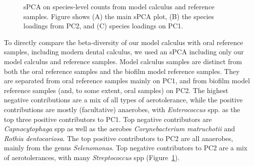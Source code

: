 \documentclass[
  b5paper,
]{book}
\begin{document}
\begin{figure}


\caption{\label{fig-spca-compar}sPCA on species-level counts from model
calculus and reference samples. Figure shows (A) the main sPCA plot, (B)
the species loadings from PC2, and (C) species loadings on PC1.}

\end{figure}%

To directly compare the beta-diversity of our model calculus with oral
reference samples, including modern dental calculus, we used an sPCA
including only our model calculus and reference samples. Model calculus
samples are distinct from both the oral reference samples and the
biofilm model reference samples. They are separated from oral reference
samples mainly on PC1, and from biofilm model reference samples (and, to
some extent, oral samples) on PC2. The highest negative contributions
are a mix of all types of aerotolerance, while the positive
contributions are mostly (facultative) anaerobes, with
\emph{Enterococcus} spp. as the top three positive contributors to PC1.
Top negative contributors are \emph{Capnocytophaga} spp as well as the
aerobes \emph{Corynebacterium matruchotii} and \emph{Rothia
dentocariosa}. The top positive contributors to PC2 are all anaerobes,
mainly from the genus \emph{Selenomonas}. Top negative contributors to
PC2 are a mix of aerotolerances, with many \emph{Streptococcus} spp
(Figure~\ref{fig-spca-compar}).
\end{document}

